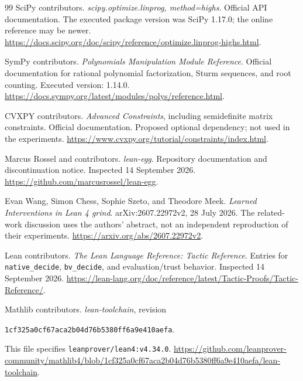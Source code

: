 \documentclass[11pt,a4paper]{article}
\theoremstyle{definition}
\begin{document}
\begin{thebibliography}{99}
SciPy contributors. \emph{scipy.optimize.linprog, method=highs}. Official API documentation. The executed package version was SciPy 1.17.0; the online reference may be newer.
\url{https://docs.scipy.org/doc/scipy/reference/optimize.linprog-highs.html}.

SymPy contributors. \emph{Polynomials Manipulation Module Reference}. Official documentation for rational polynomial factorization, Sturm sequences, and root counting. Executed version: 1.14.0.
\url{https://docs.sympy.org/latest/modules/polys/reference.html}.

CVXPY contributors. \emph{Advanced Constraints}, including semidefinite matrix constraints. Official documentation. Proposed optional dependency; not used in the experiments.
\url{https://www.cvxpy.org/tutorial/constraints/index.html}.

Marcus Rossel and contributors. \emph{lean-egg}. Repository documentation and discontinuation notice. Inspected 14 September 2026.
\url{https://github.com/marcusrossel/lean-egg}.

Evan Wang, Simon Chess, Sophie Szeto, and Theodore Meek. \emph{Learned Interventions in Lean 4 grind}. arXiv:2607.22972v2, 28 July 2026. The related-work discussion uses the authors' abstract, not an independent reproduction of their experiments.
\url{https://arxiv.org/abs/2607.22972v2}.

Lean contributors. \emph{The Lean Language Reference: Tactic Reference}. Entries for \texttt{native\_decide}, \texttt{bv\_decide}, and evaluation/trust behavior. Inspected 14 September 2026.
\url{https://lean-lang.org/doc/reference/latest/Tactic-Proofs/Tactic-Reference/}.

Mathlib contributors. \emph{lean-toolchain}, revision\par
{\small\texttt{1cf325a0cf67aca2b04d76b5380ff6a9e410aefa}}.\par
This file specifies \texttt{leanprover/lean4:v4.34.0}.
\url{https://github.com/leanprover-community/mathlib4/blob/1cf325a0cf67aca2b04d76b5380ff6a9e410aefa/lean-toolchain}.
\end{thebibliography}
\end{document}

